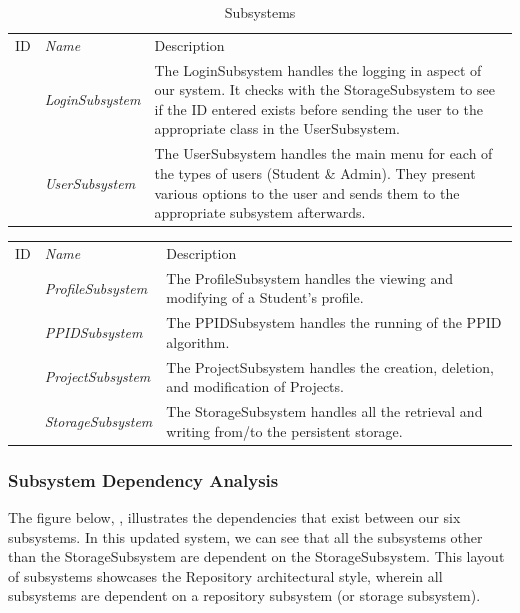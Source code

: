 \documentclass[12pt,letterpaper]{article}
\begin{document}
\begin{table}[H]
	\caption{Subsystems} 
    \begin{tabu} to 
        \tableheader{}ID & Name & Description \\
         & LoginSubsystem & The LoginSubsystem handles the logging in aspect of our system. It checks with the StorageSubsystem to see if the ID entered exists before sending the user to the appropriate class in the UserSubsystem.\\
         & UserSubsystem & The UserSubsystem handles the main menu for each of the types of users (Student \& Admin). They present various options to the user and sends them to the appropriate subsystem afterwards.\\
    \end{tabu}
\end{table}

\begin{center}
\begin{tabu} to 
        \tableheader{}ID & Name & Description \\
	 & ProfileSubsystem & The ProfileSubsystem handles the viewing and modifying of a Student's profile.\\
         & PPIDSubsystem & The PPIDSubsystem handles the running of the PPID algorithm.\\
         & ProjectSubsystem & The ProjectSubsystem handles the creation, deletion, and modification of Projects.\\
         & StorageSubsystem & The StorageSubsystem handles all the retrieval and writing from/to the persistent storage.\\
\end{tabu}
\end{center}

\subsubsection{Subsystem Dependency Analysis}

The figure below, , illustrates the dependencies that exist between our six subsystems. In this updated system, we can see that all the subsystems other than the StorageSubsystem are dependent on the StorageSubsystem. This layout of subsystems showcases the Repository architectural style, wherein all subsystems are dependent on a repository subsystem (or storage subsystem). 
\end{document}

